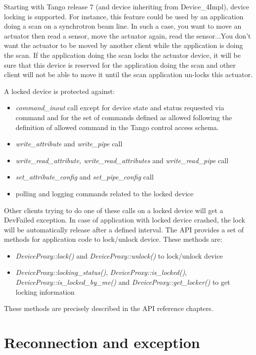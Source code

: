 Starting with Tango release 7 (and device inheriting from Device\_4Impl),
device locking is supported. For instance, this feature could be used
by an application doing a scan on a synchrotron beam line. In such
a case, you want to move an actuator then read a sensor, move the
actuator again, read the sensor...You don't want the actuator to be
moved by another client while the application is doing the scan. If
the application doing the scan locks the actuator device, it will
be sure that this device is \textquotedbl{}reserved\textquotedbl{}
for the application doing the scan and other client will not be able
to move it until the scan application un-locks this actuator.

A locked device is protected against:
\begin{itemize}
\item \emph{command\_inout} call except for device state and status requested
via command and for the set of commands defined as allowed following
the definition of allowed command in the Tango control access schema.
\item \emph{write\_attribute} and \emph{write\_pipe} call
\item \emph{write\_read\_attribute, write\_read\_attributes} and \emph{write\_read\_pipe}
call
\item \emph{set\_attribute\_config }and\emph{ set\_pipe\_config} call
\item polling and logging commands related to the locked device
\end{itemize}
Other clients trying to do one of these calls on a locked device will
get a DevFailed exception. In case of application with locked device
crashed, the lock will be automatically release after a defined interval.
The API provides a set of methods for application code to lock/unlock
device. These methods are:
\begin{itemize}
\item \emph{DeviceProxy::lock()} and \emph{DeviceProxy::unlock()} to lock/unlock
device
\item \emph{DeviceProxy::locking\_status()}, \emph{DeviceProxy::is\_locked()},
\emph{DeviceProxy::is\_locked\_by\_me()} and \emph{DeviceProxy::get\_locker()}
to get locking information
\end{itemize}
These methods are precisely described in the API reference chapters.

\section{Reconnection and exception}

